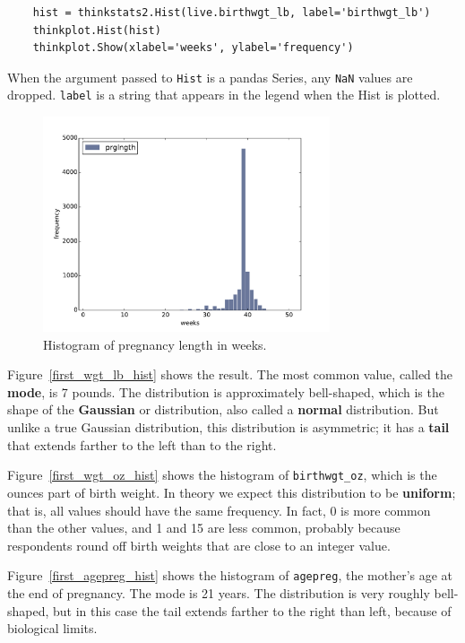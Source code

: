 \documentclass[12pt]{book}
\begin{document}
\begin{verbatim}
    hist = thinkstats2.Hist(live.birthwgt_lb, label='birthwgt_lb')
    thinkplot.Hist(hist)
    thinkplot.Show(xlabel='weeks', ylabel='frequency')
\end{verbatim}

When the argument passed to {\tt Hist} is a pandas Series, any
{\tt NaN} values are dropped.  {\tt label} is a string that appears
in the legend when the Hist is plotted.

\begin{figure}
\centerline{\includegraphics[height=2.5in]{figs/first_prglngth_hist.pdf}}
\caption{Histogram of pregnancy length in weeks.}
\label{first_prglngth_hist}
\end{figure}

Figure~\ref{first_wgt_lb_hist} shows the result.  The most common
value, called the {\bf mode}, is 7 pounds.  The distribution is
approximately bell-shaped, which is the shape of the {\bf Gaussian} or
distribution, also called a {\bf normal} distribution.  But unlike a
true Gaussian distribution, this distribution is asymmetric; it has
a {\bf tail} that extends farther to the left than to the right.

Figure~\ref{first_wgt_oz_hist} shows the histogram of
\verb"birthwgt_oz", which is the ounces part of birth weight.  In
theory we expect this distribution to be {\bf uniform}; that is, all
values should have the same frequency.  In fact, 0 is more common than
the other values, and 1 and 15 are less common, probably because
respondents round off birth weights that are close to an integer
value.

Figure~\ref{first_agepreg_hist} shows the histogram of \verb"agepreg",
the mother's age at the end of pregnancy.  The mode is 21 years.  The
distribution is very roughly bell-shaped, but in this case the tail
extends farther to the right than left, because of biological limits.
\end{document}
